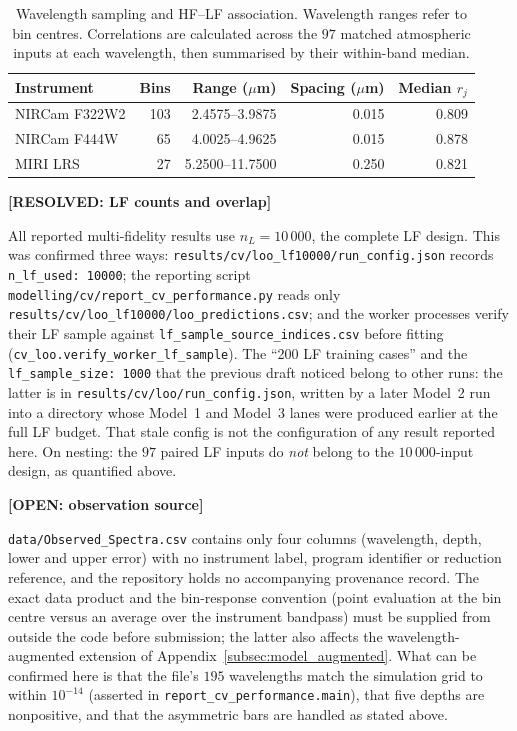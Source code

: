 \documentclass[12pt, letterpaper, oneside]{article}
\newcommand{\resolved}[2]{\par\begingroup\small\color{green!35!black}%
\noindent\textbf{[RESOLVED: #1]}\par\nobreak\noindent #2\par\endgroup}
\newcommand{\openitem}[2]{\par\begingroup\small\color{red!65!black}%
\noindent\textbf{[OPEN: #1]}\par\nobreak\noindent #2\par\endgroup}
\begin{document}
\begin{table}[t]
    \centering
    \small
    \caption{Wavelength sampling and HF--LF association.
    Wavelength ranges refer to bin centres. Correlations are
    calculated across the $97$ matched atmospheric inputs at each
    wavelength, then summarised by their within-band median.}
    \label{tab:spectral_data}
    \begin{tabular}{lrrrr}
        \toprule
        Instrument & Bins &
        Range ($\mu$m) &
        Spacing ($\mu$m) &
        Median $r_j$ \\
        \midrule
        NIRCam F322W2 & 103 & 2.4575--3.9875 & 0.015 & 0.809 \\
        NIRCam F444W  & 65  & 4.0025--4.9625 & 0.015 & 0.878 \\
        MIRI LRS      & 27  & 5.2500--11.7500 & 0.250 & 0.821 \\
        \bottomrule
    \end{tabular}
\end{table}

\resolved{LF counts and overlap}{All reported multi-fidelity results use
$n_L=10\,000$, the complete LF design. This was confirmed three ways:
\texttt{results/cv/loo\_lf10000/run\_config.json} records
\texttt{n\_lf\_used: 10000}; the reporting script
\texttt{modelling/cv/report\_cv\_performance.py} reads only
\texttt{results/cv/loo\_lf10000/loo\_predictions.csv}; and the worker processes
verify their LF sample against
\texttt{lf\_sample\_source\_indices.csv} before fitting
(\texttt{cv\_loo.verify\_worker\_lf\_sample}). The ``200 LF training cases''
and the \texttt{lf\_sample\_size: 1000} that the previous draft noticed belong
to other runs: the latter is in \texttt{results/cv/loo/run\_config.json},
written by a later Model~2 run into a directory whose Model~1 and Model~3
lanes were produced earlier at the full LF budget. That stale config is not
the configuration of any result reported here. On nesting: the $97$ paired LF
inputs do \emph{not} belong to the $10\,000$-input design, as quantified
above.}

\openitem{observation source}{\texttt{data/Observed\_Spectra.csv} contains
only four columns (wavelength, depth, lower and upper error) with no
instrument label, program identifier or reduction reference, and the
repository holds no accompanying provenance record. The exact data product and
the bin-response convention (point evaluation at the bin centre versus an
average over the instrument bandpass) must be supplied from outside the code
before submission; the latter also affects the wavelength-augmented extension
of Appendix~\ref{subsec:model_augmented}. What can be confirmed here is that
the file's $195$ wavelengths match the simulation grid to within $10^{-14}$
(asserted in \texttt{report\_cv\_performance.main}), that five depths are
nonpositive, and that the asymmetric bars are handled as stated above.}
\end{document}
